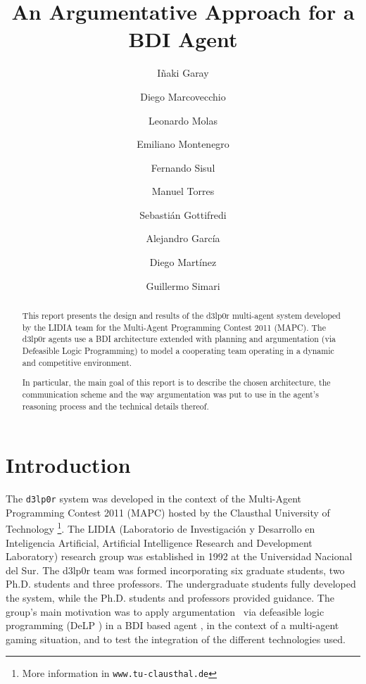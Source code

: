 \documentclass{llncs2e/llncs}
\title{An Argumentative Approach for a BDI Agent}
\author{I\~{n}aki Garay \and      %
        Diego Marcovecchio \and   %
        Leonardo Molas \and       %
        Emiliano Montenegro \and  %
        Fernando Sisul \and       %
        Manuel Torres \and        %
        Sebastián Gottifredi \and %
        Alejandro García \and     %
        Diego Martínez \and       %
        Guillermo Simari          %
        }
\institute{Universidad Nacional del Sur \\\email{\{igarai,diegomarcov,%
emm.montenegro,fsisul,jmtorresluc\}@gmail.com,\\\{lam,sg,ajg,dcm,grs\}%
@cs.uns.edu.ar}}
\begin{document}
\maketitle

\begin{abstract}
    This report presents the design and results of the d3lp0r multi-agent system 
    developed by the LIDIA team for the Multi-Agent Programming Contest 2011 (MAPC).
    The d3lp0r agents use a BDI architecture extended with planning and 
    argumentation (via Defeasible Logic Programming) to model a cooperating team 
    operating in a dynamic and competitive environment.

    In particular, the main goal of this report is to describe the chosen 
    architecture, the communication scheme and the way argumentation was put to 
    use in the agent's reasoning process and the technical details thereof.
\end{abstract}

\section{Introduction}

    The \texttt{d3lp0r} system was developed in the context of the Multi-Agent
    Programming Contest 2011 (MAPC) \cite{BehrensAMAI2010b} hosted by the
    Clausthal University of Technology \footnote{More information in
    \texttt{www.tu-clausthal.de}}.  The LIDIA (Laboratorio de Investigación
    y Desarrollo en Inteligencia Artificial, Artificial Intelligence Research
    and Development Laboratory) research group was established in 1992 at the
    Universidad Nacional del Sur.  The d3lp0r team was formed incorporating six
    graduate students, two Ph.D.  students and three professors. The
    undergraduate students fully developed the system, while the Ph.D. students
    and professors provided guidance. The group's main motivation was to apply
    argumentation \cite{Prakken:1997} \cite{Rahwan:2009}
    \cite{Bench-Capon:2007}\ via defeasible logic programming (DeLP
    \cite{Garcia:2004a}) in a BDI based agent \cite{Amgoud:2008}, in the context
    of a multi-agent gaming situation, and to test the integration of the
    different technologies used.

%
\end{document}
